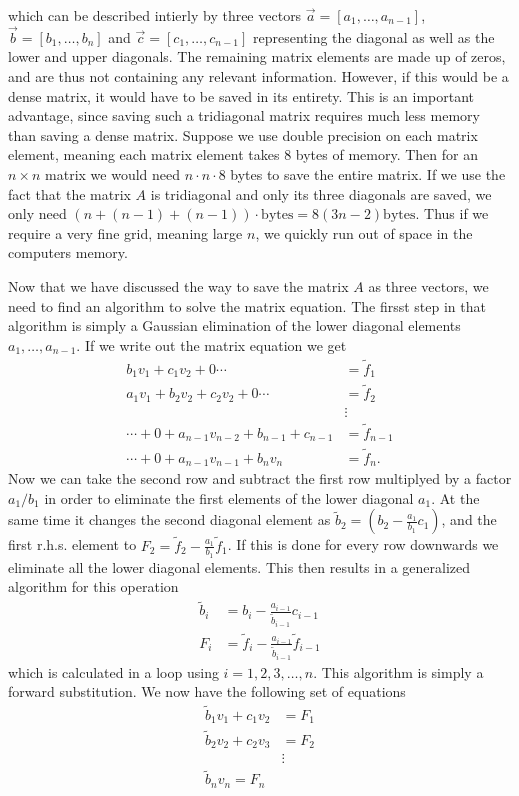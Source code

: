 \documentclass[twocolumn]{aastex62}
\begin{document}
which can be described intierly by three vectors $\vec{a} = [a_1,\ldots, a_{n-1}]$, $\vec{b} = [b_1,\ldots,b_n]$ and $\vec{c} = [c_1,\ldots,c_{n-1}]$ representing the diagonal as well as the lower and upper diagonals. The remaining matrix elements are made up of zeros, and are thus not containing any relevant information. However, if this would be a dense matrix, it would have to be saved in its entirety. This is an important advantage, since saving such a tridiagonal matrix requires much less memory than saving a dense matrix. Suppose we use double precision on each matrix element, meaning each matrix element takes 8 bytes of memory. Then for an $n\times n$ matrix we would need $n\cdot n\cdot 8$ bytes to save the entire matrix. If we use the fact that the matrix $A$ is tridiagonal and only its three diagonals are saved, we only need $\left(n + (n-1) + (n-1)\right) \cdot \text{bytes} = 8(3n - 2) \text{bytes}$. Thus if we require a very fine grid, meaning large $n$, we quickly run out of space in the computers memory. 

Now that we have discussed the way to save the matrix $A$ as three vectors, we need to find an algorithm to solve the matrix equation. The firsst step in that algorithm is simply a Gaussian elimination of the lower diagonal elements $a_1,\ldots, a_{n-1}$. If we write out the matrix equation we get 
\begin{align}
	b_1 v_1 + c_1v_2 + 0  \cdots &= \tilde{f}_1\\
	a_1 v_1 + b_2 v_2 + c_2 v_2 + 0 \cdots &= \tilde{f}_2\\
	&\vdots\\
	\cdots+0+a_{n-1} v_{n-2} + b_{n-1} + c_{n-1} &= \tilde{f}_{n-1}\\
	\cdots+0+a_{n-1}v_{n-1} + b_{n} v_{n} &= \tilde{f}_n.
\end{align}
Now we can take the second row and subtract the first row multiplyed by a factor $a_1/b_1$ in order to eliminate the first elements of the lower diagonal $a_1$. At the same time it changes the second diagonal element as $\tilde{b}_2 = (b_2 - \frac{a_1}{b_1}c_1)$, and the first r.h.s. element to $F_2 = \tilde{f}_2 - \frac{a_1}{b_1}\tilde{f}_1$. If this is done for every row downwards we eliminate all the lower diagonal elements. This then results in a generalized algorithm for this operation
\begin{align}
	\tilde{b}_i &= b_i - \frac{a_{i-1}}{\tilde{b}_{i-1}}c_{i-1}\\
	F_i & = \tilde{f}_i - \frac{a_{i-1}}{\tilde{b}_{i-1}}\tilde{f}_{i - 1}
\end{align}
which is calculated in a loop using $i=1,2,3,\ldots, n$. This algorithm is simply a forward substitution. We now have the following set of equations
\begin{align}
	\tilde{b}_1v_1 + c_1v_2  &= F_1\\
	\tilde{b}_2v_2 + c_2v_3 &= F_2\\
	&\vdots\\
	\tilde{b}_nv_n = F_n	
\end{align}
\end{document}

